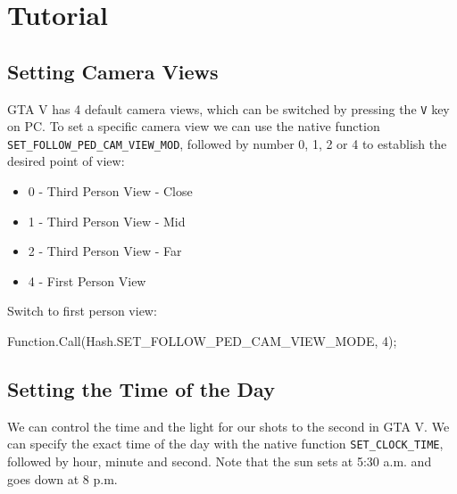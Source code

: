 \documentclass[
  openany]{book}
\newenvironment{Shaded}{\begin{snugshade}}{\end{snugshade}}
\newcommand{\DecValTok}[1]{\textcolor[rgb]{0.00,0.00,0.81}{#1}}
\newcommand{\FunctionTok}[1]{\textcolor[rgb]{0.00,0.00,0.00}{#1}}
\newcommand{\NormalTok}[1]{#1}
\providecommand{\tightlist}{%
  \setlength{\itemsep}{0pt}\setlength{\parskip}{0pt}}
\begin{document}
\hypertarget{tutorial-5}{%
\section*{Tutorial}\label{tutorial-5}}

\hypertarget{setting-camera-views}{%
\subsection*{Setting Camera Views}\label{setting-camera-views}}

GTA V has 4 default camera views, which can be switched by pressing the \texttt{V} key on PC.
To set a specific camera view we can use the native function \texttt{SET\_FOLLOW\_PED\_CAM\_VIEW\_MOD}, followed by number 0, 1, 2 or 4 to establish the desired point of view:

\begin{itemize}
\tightlist
\item
  0 - Third Person View - Close
\item
  1 - Third Person View - Mid
\item
  2 - Third Person View - Far
\item
  4 - First Person View
\end{itemize}

Switch to first person view:

\begin{Shaded}
\begin{Highlighting}[]
\NormalTok{Function.}\FunctionTok{Call}\NormalTok{(Hash.}\FunctionTok{SET_FOLLOW_PED_CAM_VIEW_MODE}\NormalTok{, }\DecValTok{4}\NormalTok{); }
\end{Highlighting}
\end{Shaded}

\hypertarget{setting-the-time-of-the-day}{%
\subsection*{Setting the Time of the Day}\label{setting-the-time-of-the-day}}

We can control the time and the light for our shots to the second in GTA V. We can specify the exact time of the day with the native function \texttt{SET\_CLOCK\_TIME}, followed by hour, minute and second. Note that the sun sets at 5:30 a.m. and goes down at 8 p.m.
\end{document}

